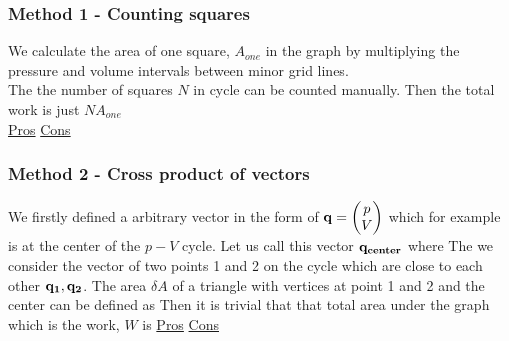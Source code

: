 \documentclass[10pt]{article}
\begin{document}
\subsubsection{Method 1 - Counting squares}
We calculate the area of one square, $A_{one}$ in the graph by multiplying the pressure and volume intervals between minor grid lines.\\
The the number of squares $N$ in cycle can be counted manually. Then the total work is just $NA_{one}$\\[1em]
\underline{Pros}
\underline{Cons}

\subsubsection{Method 2 - Cross product of vectors}
\label{Method 2}
We firstly defined a arbitrary vector in the form of $\bf{q}=\begin{pmatrix}p\\V\end{pmatrix}$ which for example is at the center of the $p-V$ cycle. Let us call this vector $\bf{q_{center}}$ where
The we consider the vector of two points 1 and 2 on the cycle which are close to each other $\bf{q_1},\bf{q_2}$. The area $\delta A$ of a triangle with vertices at point 1 and 2 and the center can be defined as
Then it is trivial that that total area under the graph which is the work, $W$ is
\underline{Pros}
\underline{Cons}
\end{document}
